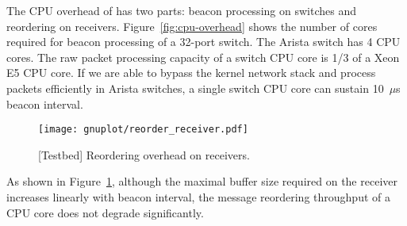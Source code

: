 The CPU overhead of \sys has two parts: beacon processing on switches and reordering on receivers.
Figure~\ref{fig:cpu-overhead} shows the number of cores required for beacon processing of a 32-port switch. The Arista switch has 4 CPU cores. The raw packet processing capacity of a switch CPU core is 1/3 of a Xeon E5 CPU core. If we are able to bypass the kernel network stack and process packets efficiently in Arista switches, a single switch CPU core can sustain 10~$\mu$s beacon interval.


\begin{figure}[t]
\centering
\texttt{[image: gnuplot/reorder\_receiver.pdf]}
\caption{[Testbed] Reordering overhead on receivers.}
\label{fig:reorder-overhead}
\end{figure}

As shown in Figure~\ref{fig:reorder-overhead}, although the maximal buffer size required on the receiver increases linearly with beacon interval, the message reordering throughput of a CPU core does not degrade significantly.

\iffalse
\subsection{Deep Dive}

\subsubsection{Fault Tolerance}
\label{sec:eval-fault-tolerance}

\textbf{Failure.}
When a host or switch or link fails, its adjacent switch will detect the failure after beacon timeout.

\textbf{Failure recovery / New node joining.}
After a host recovers from failure, the 

\textbf{Route Change.}

\begin{figure}[t]
\centering
	\subfloat[Normal host.\label{fig:failure-normal}]
	{\texttt{[image: images/fixme.pdf]}}
	\hspace{0.01\textwidth}
	\subfloat[Failure host.\label{fig:failure-failed}]
	{\texttt{[image: images/fixme.pdf]}}
	\caption{[Simulation] Throughput and latency during a host failure and its recovery.}
	\label{fig:failure}
    \vspace{-15pt}
\end{figure}

Figure~\ref{fig:failure}, time graph. X axis: time, Y axis: throughput and latency (on left and right side)
\fi

